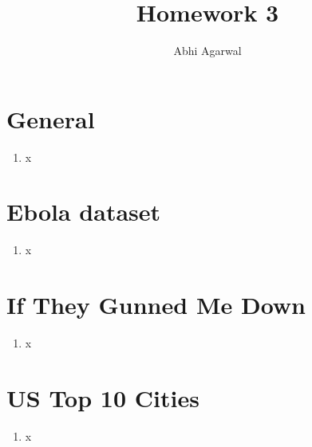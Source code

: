 \documentclass[11pt, oneside]{article}
\title{Homework 3}
\author{Abhi Agarwal}
\date{}
\begin{document}
\maketitle

\section*{General}

\begin{enumerate}
\item x
\end{enumerate}

\section*{Ebola dataset}

\begin{enumerate}
\item x
\end{enumerate}

\section*{If They Gunned Me Down}

\begin{enumerate}
\item x
\end{enumerate}

\section*{US Top 10 Cities}

\begin{enumerate}
\item x
\end{enumerate}
\end{document}
